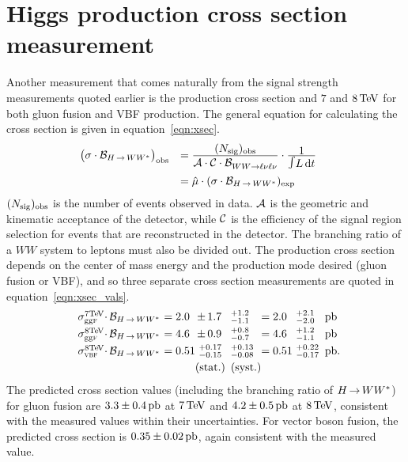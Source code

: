 \section{Higgs production cross section measurement}

Another measurement that comes naturally from the signal strength measurements quoted earlier is the production cross section and $7$ and $8 \TeV$ for both gluon fusion and VBF production. The general equation for calculating the cross section is given in equation~\ref{eqn:xsec}. 
%
\begin{equation}
\begin{array}{ll}
\nq\big(\sigma \cdot\mathcal{B}_{\HWW}\big)_\obs
&=
\frac{\displaystyle (\Nsig)_\obs}
     {\displaystyle \Acc\cdot\Cor\cdot\mathcal{B}_{WW\rightarrow \ell\nu\ell\nu}^{\phantom{X}}}
\cdot
\frac{\displaystyle 1}{\displaystyle\Lint} \\
\clineskip
\clineskip
&= 
{\displaystyle \hat{\mu} \cdot (\sigma\cdot\mathcal{B}_{\HWW})_\exp}
\end{array}
\label{eqn:xsec}
\end{equation}
%
$(N_{\rm sig})_{\rm obs}$ is the number of events observed in data. $\mathcal{A}$ is the geometric and kinematic acceptance of the detector, while $\mathcal{C}$ is the efficiency of the signal region selection for events that are reconstructed in the detector. The branching ratio of a $WW$ system to leptons must also be divided out. The production cross section depends on the center of mass energy and the production mode desired (gluon fusion or VBF), and so three separate cross section measurements are quoted in equation~\ref{eqn:xsec_vals}.
%
\begin{equation}
\begin{array}{lllllll}
\np\sigma_{\scggF}^{7\!\TeV}{\!\CDOT}\mathcal{B}_{\HWW}\np&= 2.0 \np\no&{\PM}1.7            \no\!&^{+1.2}_{-1.1}  \np\no&=2.0 \np\no&\,\,^{+2.1}_{-2.0}   \np&\pb \nq\\ \clineskip
\np\sigma_{\scggF}^{8\!\TeV}{\!\CDOT}\mathcal{B}_{\HWW}\np&= 4.6 \np\no&{\PM}0.9            \no\!&^{+0.8}_{-0.7}  \np\no&=4.6 \np\no&\,\,^{+1.2}_{-1.1}    \np&\pb \nq\\ \clineskip
\np\sigma_{\scVX }^{8\!\TeV}{\!\CDOT}\mathcal{B}_{\HWW}\np&= 0.51\np\no&\,\,^{+0.17}_{-0.15}\no\!&^{+0.13}_{-0.08}\np\no&=0.51\np\no&\,\,^{+0.22}_{-0.17} \np&\pb.\nq\\ \clineskip
\np                                                       &      \np\no&\textrm{(stat.)}    \no\!&\textrm{(syst.)}\np\no
\end{array}
\label{eqn:xsec_vals}
\end{equation}
%
The predicted cross section values (including the branching ratio of $H{\,{\rightarrow}\,}WW^\ast$) for gluon fusion are $3.3 \pm 0.4 \mbox{\,pb}$ at $7 \TeV$ and $4.2 \pm 0.5 \mbox{\,pb}$ at $8 \TeV$, consistent with the measured values within their uncertainties. For vector boson fusion, the predicted cross section is $0.35 \pm 0.02 \mbox{\,pb}$, again consistent with the measured value. 

